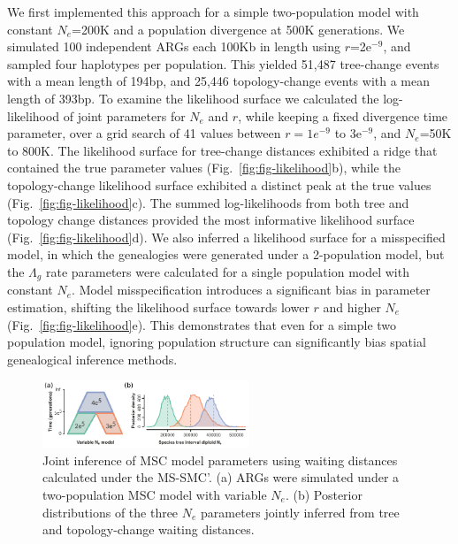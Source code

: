 \documentclass[11pt]{article}
\begin{document}
We first implemented this approach for a simple two-population model with 
constant $N_e$=200K and a population divergence at 500K generations. 
We simulated 100 independent ARGs each 100Kb in length using $r$=2e$^{-9}$, 
and sampled four haplotypes per population. This 
yielded 51,487 tree-change events with a mean length of 194bp, and 25,446 
topology-change events with a mean length of 393bp. To examine the likelihood
surface we calculated the log-likelihood of joint parameters for $N_e$ and $r$, 
while keeping a fixed divergence time parameter, over a grid search of 41 
values between $r=1e^{-9}$ to 3e$^{-9}$, and $N_e$=50K to 800K. The likelihood
surface for tree-change distances exhibited a ridge that contained the true 
parameter values (Fig.~\ref{fig:fig-likelihood}b), while the topology-change 
likelihood surface exhibited a distinct peak at the true values
(Fig.~\ref{fig:fig-likelihood}c). The summed log-likelihoods from both tree 
and topology change distances provided the most informative likelihood surface
(Fig.~\ref{fig:fig-likelihood}d).
We also inferred a likelihood surface for a misspecified model, in which 
the genealogies were generated under a 2-population model, but 
the $\Lambda_g$ rate parameters were calculated for a single population 
model with constant $N_e$. Model misspecification introduces a significant 
bias in parameter estimation, shifting the likelihood surface towards lower $r$ 
and higher $N_e$ (Fig.~\ref{fig:fig-likelihood}e). This demonstrates that even 
for a simple two population model, ignoring population structure can significantly
bias spatial genealogical inference methods.

\begin{figure}[t]
	\centering
	\includegraphics[width=0.55\textwidth]{figures/likelihood-posteriors.pdf}
	\caption{
		Joint inference of MSC model parameters using waiting distances 
		calculated under the MS-SMC'. (a) ARGs were simulated under a two-population 
		MSC model with variable $N_e$. (b) Posterior distributions of the three 
		$N_e$ parameters jointly inferred from tree and topology-change waiting 
		distances.
	}
	\label{fig:fig-likelihood-posterior}
\end{figure}
\end{document}

